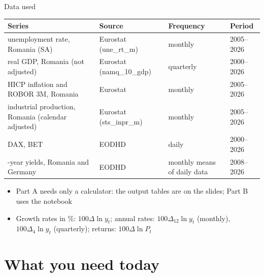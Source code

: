 \begin{frame}{Data used}
\itemsize{\small}
\begin{center}
\footnotesize
\begin{tabular}{>{\raggedright\arraybackslash}p{4.4cm}>{\raggedright\arraybackslash}p{3.2cm}>{\raggedright\arraybackslash}p{2.6cm}l}
\toprule
\textbf{Series} & \textbf{Source} & \textbf{Frequency} & \textbf{Period} \\
\midrule
unemployment rate, Romania (SA) & Eurostat (une\_rt\_m) & monthly & 2005--2026 \\
real GDP, Romania (not adjusted) & Eurostat (namq\_10\_gdp) & quarterly & 2000--2026 \\
HICP inflation and ROBOR 3M, Romania & Eurostat & monthly & 2005--2026 \\
industrial production, Romania (calendar adjusted) & Eurostat (sts\_inpr\_m) & monthly & 2005--2026 \\
DAX, BET & EODHD & daily & 2000--2026 \\
10-year yields, Romania and Germany & EODHD & monthly means of daily data & 2008--2026 \\
\bottomrule
\end{tabular}
\end{center}
\begin{itemize}
    \item Part A needs only a calculator: the output tables are on the slides; Part B uses the notebook
    \item Growth rates in \%: $100\Delta\ln y_t$; annual rates: $100\Delta_{12}\ln y_t$ (monthly), $100\Delta_4\ln y_t$ (quarterly); returns: $100\Delta\ln P_t$
\end{itemize}
\end{frame}


\section{What you need today}

